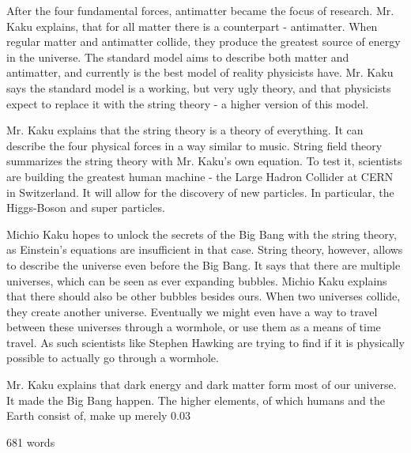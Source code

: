 \documentclass[12pt]{article}
\begin{document}
After the four fundamental forces, antimatter became the focus of research. Mr. Kaku explains, that for all matter there is a counterpart - antimatter. When regular matter and antimatter collide, they produce the greatest source of energy in the universe. The standard model aims to describe both matter and antimatter, and currently is the best model of reality physicists have. Mr. Kaku says the standard model is a working, but very ugly theory, and that physicists expect to replace it with the string theory - a higher version of this model.

Mr. Kaku explains that the string theory is a theory of everything. It can describe the four physical forces in a way similar to music. String field theory summarizes the string theory with Mr. Kaku's own equation. To test it, scientists are building the greatest human machine - the Large Hadron Collider at CERN in Switzerland. It will allow for the discovery of new particles. In particular, the Higgs-Boson and super particles.

Michio Kaku hopes to unlock the secrets of the Big Bang with the string theory, as Einstein's equations are insufficient in that case. String theory, however, allows to describe the universe even before the Big Bang. It says that there are multiple universes, which can be seen as ever expanding bubbles. Michio Kaku explains that there should also be other bubbles besides ours. When two universes collide, they create another universe. Eventually we might even have a way to travel between these universes through a wormhole, or use them as a means of time travel. As such scientists like Stephen Hawking are trying to find if it is physically possible to actually go through a wormhole.

Mr. Kaku explains that dark energy and dark matter form most of our universe. It made the Big Bang happen. The higher elements, of which humans and the Earth consist of, make up merely 0.03%

681 words
\end{document}
